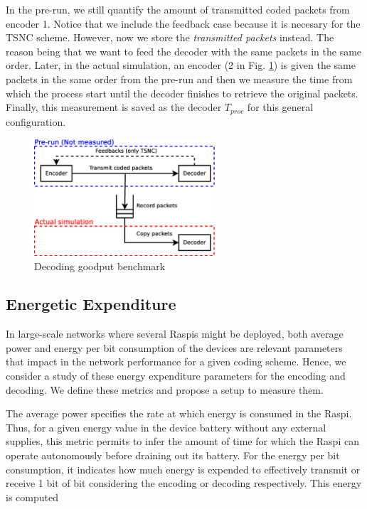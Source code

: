 In the pre-run, we still quantify the amount of transmitted coded
packets from encoder 1. Notice that we include the feedback case because
it is necesary for the \ac{TSNC} scheme. However, now we store
the \textit{transmitted packets} instead. The reason being
that we want to feed the decoder with the same packets in the same
order. Later, in the actual simulation, an encoder (2 in Fig.
\ref{fig:dec_goodput_benchmark}) is given the same packets in the same
order from the pre-run and then we measure the time from which the
process start until the decoder finishes to retrieve the original
packets. Finally, this measurement is saved as the decoder $T_{proc}$
for this general configuration.

\begin{figure}[ht!]
\centering
\includegraphics[width=0.6\textwidth]{images/measure_decoder.eps}
\caption{Decoding goodput benchmark}
\label{fig:dec_goodput_benchmark}
\end{figure}

\subsection{Energetic Expenditure}
In large-scale networks where several \ac{Raspi}s might be deployed,
both average power and energy per bit consumption of the devices are
relevant parameters that impact in the network performance for a given
coding scheme. Hence, we consider a study of these energy expenditure
parameters for the encoding and decoding. We define these metrics
and propose a setup to measure them.

The average power specifies the rate at which energy is
consumed in the \ac{Raspi}. Thus, for a given energy value in the device
battery without any external supplies, this metric permits to infer the amount
of time for which the \ac{Raspi} can operate autonomously before draining
out its battery. For the energy per bit consumption, it indicates how
much energy is expended to effectively transmit or receive 1 bit of bit
considering the encoding or decoding respectively. This energy is computed

